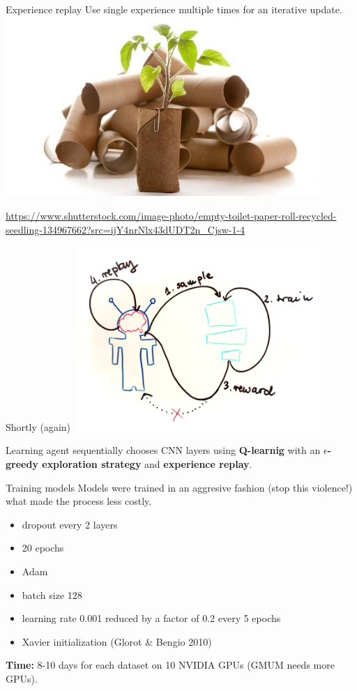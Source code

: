 \documentclass[15pt]{beamer}
\begin{document}
\begin{frame}{Experience replay}
  Use single experience multiple times for an iterative update.
  \includegraphics[width=0.9\textwidth]{reuse.jpg}\\
  \begin{tiny}
  \url{https://www.shutterstock.com/image-photo/empty-toilet-paper-roll-recycled-seedling-134967662?src=ijY4nrNlx43dUDT2n_Cjsw-1-4}
  \end{tiny}
\end{frame}


\begin{frame}{Shortly (again)}
  \centering
  \includegraphics[width=0.7\textwidth]{model.png}

  \raggedright
  Learning agent sequentially chooses CNN layers using \textbf{Q-learnig} with an \textbf{$\epsilon$-greedy exploration strategy} and \textbf{experience replay}.
\end{frame}


\begin{frame}{Training models}
  Models were trained in an aggresive fashion (stop this violence!) what made the process less costly.
  \begin{itemize}
  \item dropout every 2 layers
  \item 20 epochs
  \item Adam
  \item batch size 128
  \item learning rate 0.001 reduced by a factor of 0.2 every 5 epochs
  \item Xavier initialization (Glorot \& Bengio 2010)
  \end{itemize}

  \textbf{Time:} 8-10 days for each dataset on 10 NVIDIA GPUs (GMUM needs more GPUs).
\end{frame}
\end{document}
